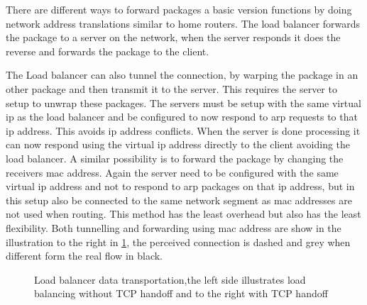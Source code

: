 There are different ways to forward packages a basic version functions by doing network address translations similar to home routers.
The load balancer forwards the package to a server on the network, when the server responds it does the reverse and forwards the package to the client.

The Load balancer can also tunnel the connection, by warping the package in an other package and then transmit it to the server. This requires the server to setup to unwrap these packages. The servers must be setup with the same virtual ip as the load balancer and be configured to now respond to arp requests to that ip address. This avoids ip address conflicts. When the server is done processing it can now respond using the virtual ip address directly to the client avoiding the load balancer.
A similar possibility is to forward the package by changing the receivers mac address. Again the server need to be configured with the same virtual ip address and not to respond to arp packages on that ip address, but in this setup also be connected to the same network segment as mac addresses are not used when routing. This method has the least overhead but also has the least flexibility. Both tunnelling and forwarding using mac address are show in the illustration to the right in \cref{fig:LoadbalancerOperation}, the perceived connection is dashed and grey when different form the real flow in black.


\begin{figure}
	\centering
	\scalebox{0.7}{}
	\scalebox{0.7}{}
	\caption[Load balancer data transportation]{
		\label{fig:LoadbalancerOperation} 
		\footnotesize{%
			Load balancer data transportation,the left side illustrates load balancing without TCP handoff and to the right with TCP handoff
		}
	}
\end{figure}



